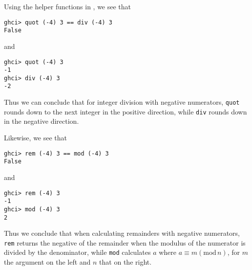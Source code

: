
Using the helper functions in , we see that
\scriptsize\begin{verbatim}
ghci> quot (-4) 3 == div (-4) 3
False
\end{verbatim}\normalsize
and
\scriptsize\begin{verbatim}
ghci> quot (-4) 3
-1
ghci> div (-4) 3
-2
\end{verbatim}\normalsize
Thus we can conclude that for integer division with negative numerators, 
\verb|quot| rounds down to the next integer in the positive direction, 
while \verb|div| rounds down in the negative direction.

Likewise, we see that
\scriptsize\begin{verbatim}
ghci> rem (-4) 3 == mod (-4) 3
False
\end{verbatim}\normalsize
and
\scriptsize\begin{verbatim}
ghci> rem (-4) 3
-1
ghci> mod (-4) 3
2
\end{verbatim}\normalsize
Thus we conclude that when calculating remainders with negative numerators, 
\verb|rem| returns the negative of the remainder when the modulus of the numerator
is divided by the denominator, while \verb|mod| calculates $a$ where 
$a \equiv m (\text{mod}\, n)$, for $m$ the argument on the left and $n$ that on the
right.
